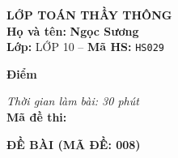 \noindent
\begin{tcolorbox}[colback=white,colframe=black,arc=0mm,boxrule=0.8pt,top=4pt,bottom=4pt,left=6pt,right=6pt]
	\begin{minipage}[c]{0.44\textwidth}
		{\bfseries\large LỚP TOÁN THẦY THÔNG}\\[3pt]
		\textbf{Họ và tên:} \textbf{\large Ngọc Sương}\\[3pt]
		\textbf{Lớp:} LỚP 10 \quad -- \quad \textbf{Mã HS:} \texttt{HS029}
	\end{minipage}
	\hfill
	\begin{minipage}[c]{0.22\textwidth}
		\begin{tcolorbox}[colback=white,colframe=black,arc=0mm,boxrule=0.6pt,height=1.8cm,halign=center,valign=top,top=2pt]
			{\bfseries\normalsize Điểm}
		\end{tcolorbox}
	\end{minipage}
	\hfill
	\begin{minipage}[c]{0.30\textwidth}
		\raggedleft
		\textit{Thời gian làm bài: 30 phút}\\[4pt]
		\textbf{Mã đề thi:} 
	\end{minipage}
\end{tcolorbox}
\vspace{0.25cm}

\noindent\textbf{\large ĐỀ BÀI (MÃ ĐỀ: 008)}
\vspace{0.1cm}


